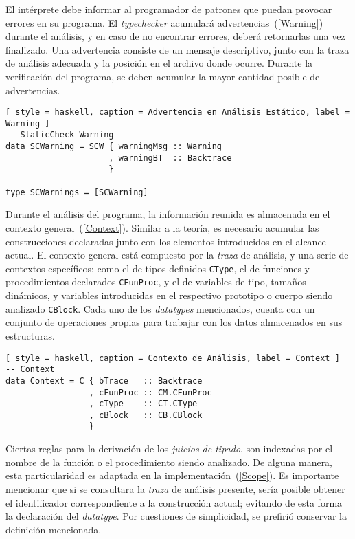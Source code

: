 El intérprete debe informar al programador de patrones que puedan provocar errores en su programa.
El \textit{typechecker} acumulará advertencias~(\ref{Warning}) durante el análisis, y en caso de no encontrar errores, deberá retornarlas una vez finalizado.
Una advertencia consiste de un mensaje descriptivo, junto con la traza de análisis adecuada y la posición en el archivo donde ocurre.
Durante la verificación del programa, se deben acumular la mayor cantidad posible de advertencias.

\begin{lstlisting}[ style = haskell, caption = Advertencia en Análisis Estático, label = Warning ]
-- StaticCheck Warning
data SCWarning = SCW { warningMsg :: Warning
                     , warningBT  :: Backtrace
                     }

type SCWarnings = [SCWarning]
\end{lstlisting}


Durante el análisis del programa, la información reunida es almacenada en el contexto general~(\ref{Context}).
Similar a la teoría, es necesario acumular las construcciones declaradas junto con los elementos introducidos en el alcance actual.
El contexto general está compuesto por la \textit{traza} de análisis, y una serie de contextos específicos; como el de tipos definidos \lstinline[style = haskell]{CType}, el de funciones y procedimientos declarados \lstinline[style = haskell]{CFunProc}, y el de variables de tipo, tamaños dinámicos, y variables introducidas en el respectivo prototipo o cuerpo siendo analizado \lstinline[style = haskell]{CBlock}.
Cada uno de los \textit{datatypes} mencionados, cuenta con un conjunto de operaciones propias para trabajar con los datos almacenados en sus estructuras.

\begin{lstlisting}[ style = haskell, caption = Contexto de Análisis, label = Context ]
-- Context
data Context = C { bTrace   :: Backtrace
                 , cFunProc :: CM.CFunProc
                 , cType    :: CT.CType
                 , cBlock   :: CB.CBlock
                 }
\end{lstlisting}


Ciertas reglas para la derivación de los \textit{juicios de tipado}, son indexadas por el nombre de la función o el procedimiento siendo analizado.
De alguna manera, esta particularidad es adaptada en la implementación~(\ref{Scope}).
Es importante mencionar que si se consultara la \textit{traza} de análisis presente, sería posible obtener el identificador correspondiente a la construcción actual; evitando de esta forma la declaración del \textit{datatype}.
Por cuestiones de simplicidad, se prefirió conservar la definición mencionada.

